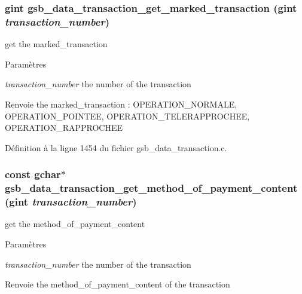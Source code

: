 \subsubsection[{gsb\_\-data\_\-transaction\_\-get\_\-marked\_\-transaction}]{\setlength{\rightskip}{0pt plus 5cm}gint gsb\_\-data\_\-transaction\_\-get\_\-marked\_\-transaction (gint {\em transaction\_\-number})}\label{gsb__data__transaction_8c_a52cf9684818c3930c5c688b54f7cf393}
get the marked\_\-transaction


\begin{DoxyParams}{Paramètres}
\item[{\em transaction\_\-number}]the number of the transaction\end{DoxyParams}
\begin{DoxyReturn}{Renvoie}
the marked\_\-transaction : OPERATION\_\-NORMALE, OPERATION\_\-POINTEE, OPERATION\_\-TELERAPPROCHEE, OPERATION\_\-RAPPROCHEE 
\end{DoxyReturn}


Définition à la ligne 1454 du fichier gsb\_\-data\_\-transaction.c.

\subsubsection[{gsb\_\-data\_\-transaction\_\-get\_\-method\_\-of\_\-payment\_\-content}]{\setlength{\rightskip}{0pt plus 5cm}const gchar$\ast$ gsb\_\-data\_\-transaction\_\-get\_\-method\_\-of\_\-payment\_\-content (gint {\em transaction\_\-number})}\label{gsb__data__transaction_8c_a018a31b8a8fe99e813b4876206cf59a1}
get the method\_\-of\_\-payment\_\-content


\begin{DoxyParams}{Paramètres}
\item[{\em transaction\_\-number}]the number of the transaction \end{DoxyParams}
\begin{DoxyReturn}{Renvoie}
the method\_\-of\_\-payment\_\-content of the transaction 
\end{DoxyReturn}


